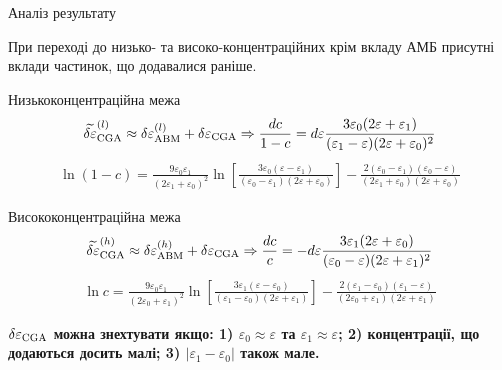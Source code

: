 \documentclass[10pt]{beamer}
\begin{document}
\begin{frame}{Аналіз результату}
\footnotesize

При переході до низько- та високо-концентраційних крім вкладу АМБ присутні вклади частинок, що додавалися раніше.

  \begin{block}{Низькоконцентраційна межа}
    \begin{equation}
        \widetilde{\delta\varepsilon}_{\rm CGA}^{(l)} \approx \delta\varepsilon_{\rm ABM}^{(l)} + \delta\varepsilon_{\rm CGA} \Rightarrow
        \frac{d c}{1-c} = d\varepsilon \frac{3\varepsilon_0(2\varepsilon + \varepsilon_1)}{(\varepsilon_1 - \varepsilon) (2\varepsilon + \varepsilon_0)^2}
    \end{equation}
    \begin{eqnarray}\label{eq:Hanai-new}
        \ln{(1-c)} = \frac{9 \varepsilon_0 \varepsilon_1}{(2\varepsilon_1 + \varepsilon_0)^2} \ln{\left[ \frac{3\varepsilon_0 (\varepsilon - \varepsilon_1)}{(\varepsilon_0 - \varepsilon_1) (2\varepsilon + \varepsilon_0)} \right]} 
        - \frac{2(\varepsilon_0 - \varepsilon_1) (\varepsilon_0 - \varepsilon)}{(2\varepsilon_1 + \varepsilon_0) (2\varepsilon + \varepsilon_0)}
    \end{eqnarray}
  \end{block}
  
  \begin{block}{Висококонцентраційна межа}
    \begin{equation}
        \widetilde{\delta\varepsilon}_{\rm CGA}^{(h)} \approx \delta\varepsilon_{\rm ABM}^{(h)} + \delta\varepsilon_{\rm CGA} \Rightarrow
        \frac{d c}{c} = - d\varepsilon \frac{3\varepsilon_1 (2\varepsilon + \varepsilon_0)}{(\varepsilon_0 - \varepsilon) (2\varepsilon + \varepsilon_1)^2}
    \end{equation}
    \begin{eqnarray}
        \ln{c} = \frac{9 \varepsilon_0 \varepsilon_1}{(2\varepsilon_0 + \varepsilon_1)^2} \ln{\left[ \frac{3\varepsilon_1 (\varepsilon - \varepsilon_0)}{(\varepsilon_1 - \varepsilon_0) (2\varepsilon + \varepsilon_1)} \right]} 
        - \frac{2(\varepsilon_1 - \varepsilon_0) (\varepsilon_1 - \varepsilon)}{(2\varepsilon_0 + \varepsilon_1) (2\varepsilon + \varepsilon_1)}
    \label{eq:Hanai-high-new}
    \end{eqnarray}
  \end{block}
  
  \textbf{$\delta\varepsilon_{\rm CGA}$ можна знехтувати якщо: 1) $\varepsilon_0 \approx \varepsilon$ та $\varepsilon_1 \approx \varepsilon$; 2) концентрації, що додаються досить малі; 3) $|\varepsilon_1-\varepsilon_0|$ також мале.}


\end{frame}
\end{document}
